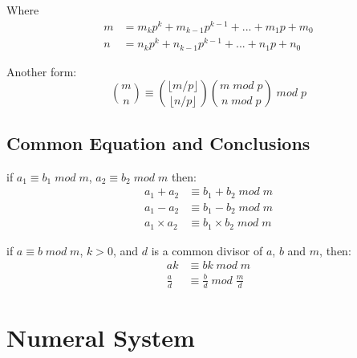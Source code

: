 \documentclass{article}
\begin{document}
    Where
    \begin{align*}
      m &= m_{k}p^{k} + m_{k-1}p^{k-1} + ... + m_{1}p + m_{0} \\
      n &= n_{k}p^{k} + n_{k-1}p^{k-1} + ... + n_{1}p + n_{0}
    \end{align*}

    Another form:
    \begin{equation*}
      \binom{m}{n} \equiv \binom{\lfloor m/p \rfloor}{\lfloor n/p \rfloor} \binom{m \; mod \; p}{n \; mod \; p} \; mod \; p
    \end{equation*}
  
  \subsection{Common Equation and Conclusions}
    if $ a_1 \equiv b_1 \; mod \; m $, $ a_2 \equiv b_2 \; mod \; m $ then:
    \begin{align*}
        a_1 + a_2 & \equiv b_1 + b_2 \; mod \; m \\
        a_1 - a_2 & \equiv b_1 - b_2 \; mod \; m \\
        a_1 \times a_2 & \equiv b_1 \times b_2 \; mod \; m
    \end{align*}

    if $ a \equiv b \; mod \; m $, $ k > 0 $, and $d$ is a common divisor of $a$, $b$ and $m$, then:
    \begin{align*}
      ak & \equiv bk \; mod \; m \\
      \frac{a}{d} & \equiv \frac{b}{d} \; mod \; \frac{m}{d}
    \end{align*}
  
\section{Numeral System}
\end{document}
